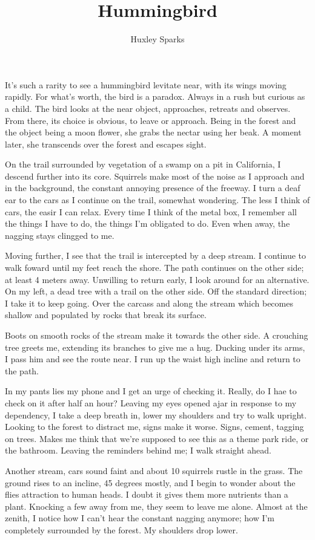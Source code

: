 \title{Hummingbird}
\author{Huxley Sparks}
\begin{docuemnt}
	
		It's such a rarity to see a hummingbird levitate near, with its wings moving rapidly. For what's worth, the bird is a paradox. Always in a rush but 
	curious as a child. The bird looks at the near object, approaches, retreats and observes. From there, its choice is obvious, to leave or approach. Being in the
	forest and the object being a moon flower, she grabs the nectar using her beak. A moment later, she transcends over the forest and escapes sight.

		On the trail surrounded by vegetation of a swamp on a pit in California, I descend further into its core. Squirrels make most of the noise as I 
	approach and in the background, the constant annoying presence of the freeway. I turn a deaf ear to the cars as I continue on the trail, somewhat wondering.
	The less I think of cars, the easir I can relax. Every time I think of the metal box, I remember all the things I have to do, the things I'm obligated to do.
	Even when away, the nagging stays clingged to me.

		Moving further, I see that the trail is intercepted by a deep stream. I continue to walk foward until my feet reach the shore. The path continues on
	the other side; at least 4 meters away. Unwilling to return early, I look around for an alternative. On my left, a dead tree with a trail on the other side.
	Off the standard direction; I take it to keep going. Over the carcass and along the stream which becomes shallow and populated by rocks that break its surface.
	
		Boots on smooth rocks of the stream make it towards the other side. A crouching tree greets me, extending its branches to give me a hug. Ducking
	under its arms, I pass him and see the route near. I run up the waist high incline and return to the path.

		In my pants lies my phone and I get an urge of checking it. Really, do I hae to check on it after half an hour? Leaving my eyes opened ajar in response
	to my dependency, I take a deep breath in, lower my shoulders and try to walk upright. Looking to the forest to distract me, signs make it worse. Signs, 
	cement, tagging on trees. Makes me think that we're supposed to see this as a theme park ride, or the bathroom. Leaving the reminders behind me; I walk
	straight ahead.	

		Another stream, cars sound faint and about 10 squirrels rustle in the grass. The ground rises to an incline, 45 degrees mostly, and I begin to wonder
	about the flies attraction to human heads. I doubt it gives them more nutrients than a plant. Knocking a few away from me, they seem to leave me alone.
	Almost at the zenith, I notice how I can't hear the constant nagging anymore; how I'm completely surrounded by the forest. My shoulders drop lower.


\end{docuemnt}
